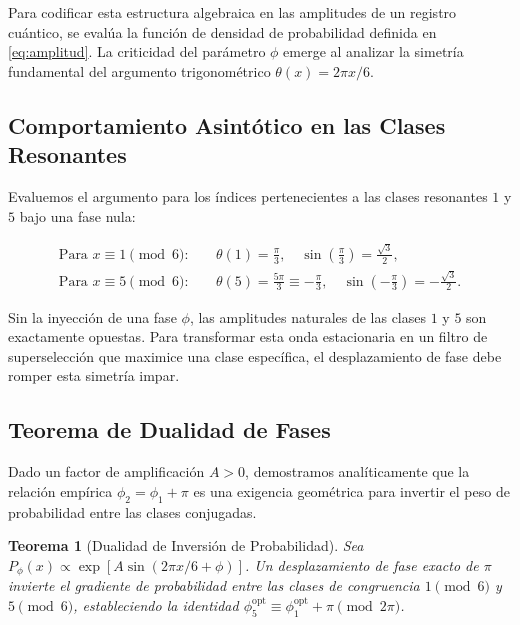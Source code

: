 \documentclass[12pt,a4paper]{article}
\theoremstyle{plain}
\newtheorem{teorema}{Teorema}[section]
\theoremstyle{definition}
\theoremstyle{remark}
\begin{document}
Para codificar esta estructura algebraica en las amplitudes de un registro cuántico, se evalúa la función de densidad de probabilidad definida en \eqref{eq:amplitud}. La criticidad del parámetro $\phi$ emerge al analizar la simetría fundamental del argumento trigonométrico $\theta(x) = 2\pi x/6$.

\subsection{Comportamiento Asintótico en las Clases Resonantes}

Evaluemos el argumento para los índices pertenecientes a las clases resonantes $1$ y $5$ bajo una fase nula:

\begin{align}
\text{Para } x \equiv 1 \pmod 6: \quad &\theta(1) = \frac{\pi}{3}, \quad \sin\left(\frac{\pi}{3}\right) = \frac{\sqrt{3}}{2}, \\
\text{Para } x \equiv 5 \pmod 6: \quad &\theta(5) = \frac{5\pi}{3} \equiv -\frac{\pi}{3}, \quad \sin\left(-\frac{\pi}{3}\right) = -\frac{\sqrt{3}}{2}.
\end{align}

Sin la inyección de una fase $\phi$, las amplitudes naturales de las clases $1$ y $5$ son exactamente opuestas. Para transformar esta onda estacionaria en un filtro de superselección que maximice una clase específica, el desplazamiento de fase debe romper esta simetría impar.

\subsection{Teorema de Dualidad de Fases}

Dado un factor de amplificación $A > 0$, demostramos analíticamente que la relación empírica $\phi_2 = \phi_1 + \pi$ es una exigencia geométrica para invertir el peso de probabilidad entre las clases conjugadas.

\begin{teorema}[Dualidad de Inversión de Probabilidad]
Sea $P_{\phi}(x) \propto \exp[A\sin(2\pi x/6 + \phi)]$. Un desplazamiento de fase exacto de $\pi$ invierte el gradiente de probabilidad entre las clases de congruencia $1 \pmod 6$ y $5 \pmod 6$, estableciendo la identidad $\phi_5^{\text{opt}} \equiv \phi_1^{\text{opt}} + \pi \pmod{2\pi}$.
\end{teorema}
\end{document}
